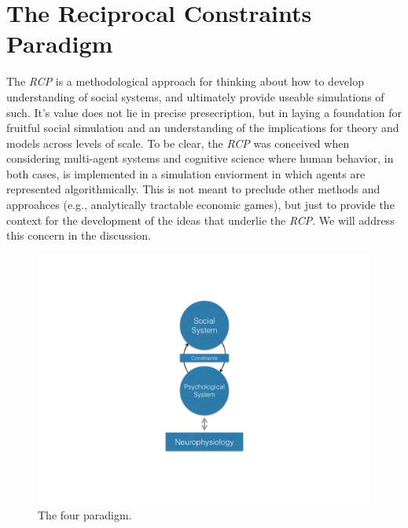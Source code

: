 \documentclass{article}
\begin{document}
\section{The Reciprocal Constraints Paradigm}
The \textit{RCP} is a methodological approach for thinking about how to develop understanding of social systems, and ultimately provide useable simulations of such.  It's value does not lie in precise presecription, but in laying a foundation for fruitful social simulation and an understanding of the implications for theory and models across levels of scale.  To be clear, the \textit{RCP} was conceived when considering multi-agent systems and cognitive science where human behavior, in both cases, is implemented in a simulation enviorment in which agents are represented algorithmically.  This is not meant to preclude other methods and approahces (e.g., analytically tractable economic games), but just to provide the context for the development of the ideas that underlie the \textit{RCP}.  We will address this concern in the discussion.

\begin{figure}
	\centering
	\includegraphics[width=1.0\textwidth]{RCP_diagram.png}
	\caption{\label{fig:rcpdiagram} The four  paradigm.  
	}
\end{figure}
\end{document}
